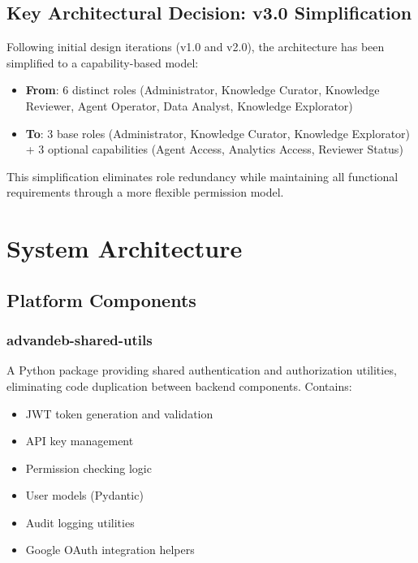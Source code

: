 \documentclass[12pt,a4paper]{article}
\begin{document}
\subsection{Key Architectural Decision: v3.0 Simplification}
Following initial design iterations (v1.0 and v2.0), the architecture has been simplified to a capability-based model:

\begin{itemize}[leftmargin=*]
    \item \textbf{From}: 6 distinct roles (Administrator, Knowledge Curator, Knowledge Reviewer, Agent Operator, Data Analyst, Knowledge Explorator)
    \item \textbf{To}: 3 base roles (Administrator, Knowledge Curator, Knowledge Explorator) + 3 optional capabilities (Agent Access, Analytics Access, Reviewer Status)
\end{itemize}

This simplification eliminates role redundancy while maintaining all functional requirements through a more flexible permission model.

\section{System Architecture}

\subsection{Platform Components}

\subsubsection{advandeb-shared-utils}
A Python package providing shared authentication and authorization utilities, eliminating code duplication between backend components. Contains:
\begin{itemize}
    \item JWT token generation and validation
    \item API key management
    \item Permission checking logic
    \item User models (Pydantic)
    \item Audit logging utilities
    \item Google OAuth integration helpers
\end{itemize}
\end{document}
